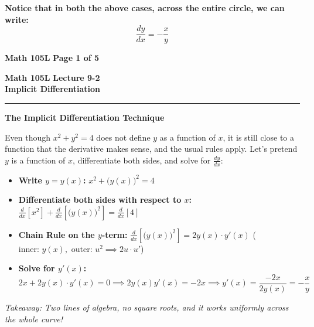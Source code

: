 \documentclass[10.5pt]{article}
\begin{document}
\vspace{0.04in}
\textbf{Notice that in both the above cases, across the entire circle, we can write:}
\[
  \frac{dy}{dx} = -\frac{x}{y}
\]

\vfill
\noindent \textbf{Math 105L} \hfill \textbf{Page 1 of 5}

\newpage

\noindent \textbf{\large Math 105L} \hfill \textbf{\large Lecture 9-2}\\[2pt]
{\textbf{\Large Implicit Differentiation}}\\[-4pt]
\rule{\textwidth}{1.2pt}

\vspace{0.03in}

\textbf{\large The Implicit Differentiation Technique}

Even though $x^2 + y^2 = 4$ does not define $y$ as a function of $x$, it is still close to a function that the derivative makes sense, and the usual rules apply. Let's pretend $y$ is a function of $x$, differentiate both sides, and solve for $\frac{dy}{dx}$:

\begin{itemize}[leftmargin=1.2em, topsep=1pt, itemsep=2pt]
  \item \textbf{Write $y = y(x)$:} \quad $x^2 + \big(y(x)\big)^2 = 4$
  \item \textbf{Differentiate both sides with respect to $x$:} \quad $\frac{d}{dx}[x^2] + \frac{d}{dx}\left[\big(y(x)\big)^2\right] = \frac{d}{dx}[4]$
  \item \textbf{Chain Rule on the $y$-term:} \quad $\frac{d}{dx}\left[\big(y(x)\big)^2\right] = 2y(x) \cdot y'(x)$ \quad ($\text{inner: } y(x), \text{ outer: } u^2 \implies 2u \cdot u'$)
  \item \textbf{Solve for $y'(x)$:}
  \[
    2x + 2y(x) \cdot y'(x) = 0 \implies 2y(x) y'(x) = -2x \implies y'(x) = \frac{-2x}{2y(x)} = -\frac{x}{y}
  \]
\end{itemize}
\textit{Takeaway: Two lines of algebra, no square roots, and it works uniformly across the whole curve!}
\end{document}
